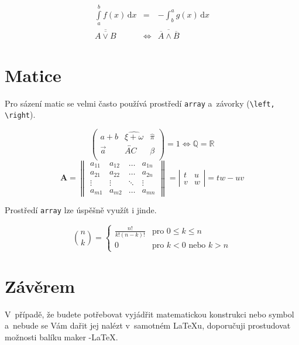 \documentclass[a4paper, 11pt, twocolumn]{article}
\theoremstyle{definition}
\theoremstyle{definition}
\begin{document}
\begin{eqnarray}
		\int\limits^b_a f(x) \, \mathrm{d}x & = & - \int^a_b g(x) \, \mathrm{d}x \\
		\overline{\overline{A \vee B}} & \Leftrightarrow & \overline{\overline{A} \wedge \overline{B}}
	\end{eqnarray}

\section{Matice}
Pro sázení matic se velmi často používá prostředí \texttt{array}
a~závorky (\verb|\left, \right|).

$$
		\left(
		\begin{array}{ccc}
			a + b & \widehat{\xi + \omega} & \hat{\pi} \\
			 \vec a & \overleftrightarrow{AC} & \beta\\
		\end{array}
		\right) = 1 \Longleftrightarrow \mathbb{Q} = \mathbb{R}
$$
$$
		\mathbf{A} =
		\left\|
		\begin{array}{cccc}
			a_{11} & a_{12} & \ldots & a_{1n} \\
			a_{21} & a_{22} & \ldots & a_{2n} \\
			\vdots & \vdots & \ddots & \vdots \\
			a_{m1} & a_{m2} & \ldots & a_{mn}
		\end{array}
		\right\| = \left|
		\begin{array}{cc}
			t & u \\
			v & w
		\end{array}
		\right|
		= tw - uv
$$

Prostředí \texttt{array} lze úspěšně využít i jinde.

$$
		\binom{n}{k} =
		\left\{
		\begin{array}{ll}
			\frac{n!}{k! (n - k)!} & \text{pro } 0 \leq k \leq n \\
			0 & \text{pro } k < 0 \text{ nebo } k > n
		\end{array}
		\right.
	$$
\section{Závěrem}
V~případě, že budete potřebovat vyjádřit matematickou
konstrukci nebo symbol a~nebude se Vám dařit jej nalézt
v~samotném \LaTeX u, doporučuji prostudovat možnosti balíku
maker \AmS-\LaTeX.
\end{document}
